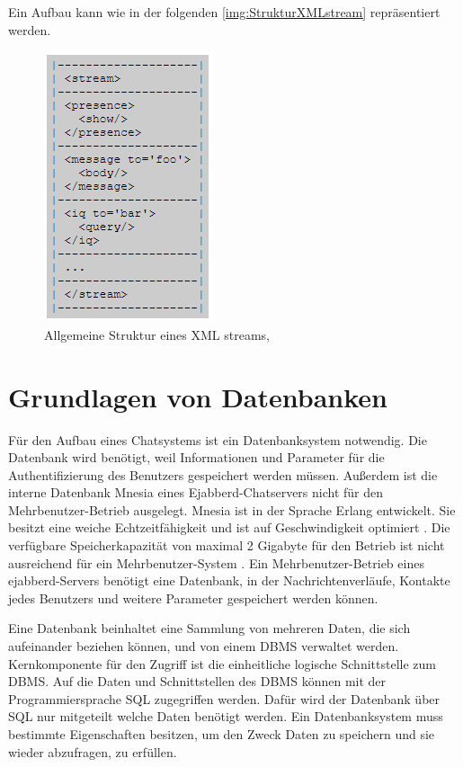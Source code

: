 \documentclass[a4paper,titlepage,halfparskip,12pt]{scrreprt}
\begin{document}
\begin{onehalfspacing}
\pagebreak

Ein Aufbau kann wie in der folgenden \autoref{img:StrukturXMLstream} repräsentiert werden. \cite{RFC6120Sec4}
\begin{figure}[h]
	\centering
	\includegraphics[scale=1.2]{images/XML_Stream}
	\caption{Allgemeine Struktur eines XML streams, \cite{RFC6120Sec4}}
	\label{img:StrukturXMLstream}
\end{figure}

\pagebreak

\section{Grundlagen von Datenbanken}
\label{sec:Datenbank}
Für den Aufbau eines Chatsystems ist ein Datenbanksystem notwendig. Die Datenbank wird benötigt, weil Informationen und Parameter für die Authentifizierung des Benutzers gespeichert werden müssen. Außerdem ist die interne Datenbank Mnesia eines Ejabberd-Chatservers nicht für den Mehrbenutzer-Betrieb ausgelegt. Mnesia ist in der Sprache Erlang entwickelt. Sie besitzt eine weiche Echtzeitfähigkeit und ist auf Geschwindigkeit optimiert \cite{MnesiaDoc}. Die verfügbare Speicherkapazität von maximal 2 Gigabyte für den Betrieb ist nicht ausreichend für ein Mehrbenutzer-System \cite{ejabberdDoc}. Ein Mehrbenutzer-Betrieb eines ejabberd-Servers benötigt eine Datenbank, in der Nachrichtenverläufe, Kontakte jedes Benutzers und weitere Parameter gespeichert werden können.

Eine Datenbank beinhaltet eine Sammlung von mehreren Daten, die sich aufeinander beziehen können, und von einem \ac{DBMS} verwaltet werden. Kernkomponente für den Zugriff ist die einheitliche logische Schnittstelle zum \ac{DBMS}. Auf die Daten und Schnittstellen des \acs{DBMS} können mit der Programmiersprache \ac{SQL} zugegriffen werden. Dafür wird der Datenbank über \ac{SQL} nur mitgeteilt welche Daten benötigt werden. Ein Datenbanksystem muss bestimmte Eigenschaften besitzen, um den Zweck Daten zu speichern und sie wieder abzufragen, zu erfüllen.


\end{onehalfspacing}
\end{document}
